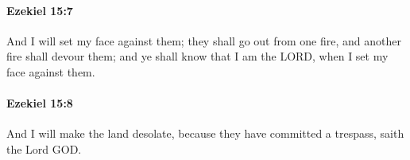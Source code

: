 		\paragraph{Ezekiel 15:7} %
			\label{EZEKIEL-15-7}

			And I will set my face against them; they shall go out from one fire, and another fire shall devour them; and ye shall know that I am the LORD, when I set my face against them.


		\paragraph{Ezekiel 15:8} %
			\label{EZEKIEL-15-8}

			And I will make the land desolate, because they have committed a trespass, saith the Lord GOD.

